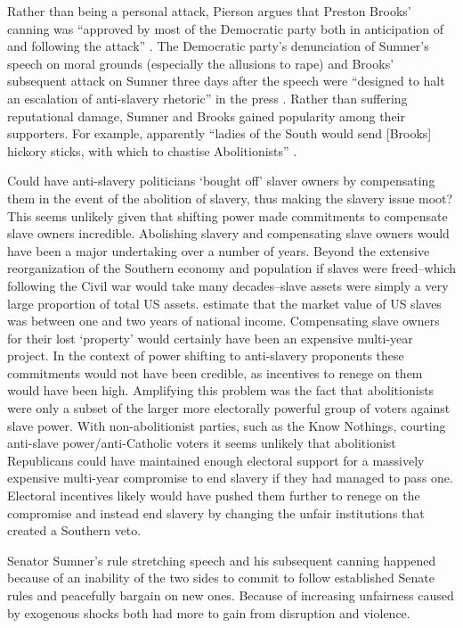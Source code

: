 \documentclass[a4paper]{article}\usepackage[]{graphicx}\usepackage[]{color}
\begin{document}
Rather than being a personal attack, Pierson argues that Preston Brooks' canning was ``approved by most of the Democratic party both in anticipation of and following the attack'' \cite[553]{Pierson1995}. The Democratic party's denunciation of Sumner's speech on moral grounds (especially the allusions to rape) and Brooks' subsequent attack on Sumner three days after the speech were ``designed to halt an escalation of anti-slavery rhetoric'' in the press \cite[553]{Pierson1995}. Rather than suffering reputational damage, Sumner and Brooks gained popularity among their supporters. For example, apparently ``ladies of the South would send [Brooks] hickory sticks, with which to chastise Abolitionists'' \cite[255]{Donald2009}. 

Could have anti-slavery politicians `bought off' slaver owners by compensating them in the event of the abolition of slavery, thus making the slavery issue moot? This seems unlikely given that shifting power made commitments to compensate slave owners incredible. Abolishing slavery and compensating slave owners would have been a major undertaking over a number of years. Beyond the extensive reorganization of the Southern economy and population if slaves were freed--which following the Civil war would take many decades--slave assets were simply a very large proportion of total US assets. \cite{Piketty2013} estimate that the market value of US slaves was between one and two years of national income. Compensating slave owners for their lost `property' would certainly have been an expensive multi-year project. In the context of power shifting to anti-slavery proponents these commitments would not have been credible, as incentives to renege on them would have been high. Amplifying this problem was the fact that abolitionists were only a subset of the larger more electorally powerful group of voters against slave power. With non-abolitionist parties, such as the Know Nothings, courting anti-slave power/anti-Catholic voters it seems unlikely that abolitionist Republicans could have maintained enough electoral support for a massively expensive multi-year compromise to end slavery if they had managed to pass one. Electoral incentives likely would have pushed them further to renege on the compromise and instead end slavery by changing the unfair institutions that created a Southern veto.

Senator Sumner's rule stretching speech and his subsequent canning happened because of an inability of the two sides to commit to follow established Senate rules and peacefully bargain on new ones. Because of increasing unfairness caused by exogenous shocks both had more to gain from disruption and violence. 
\end{document}
